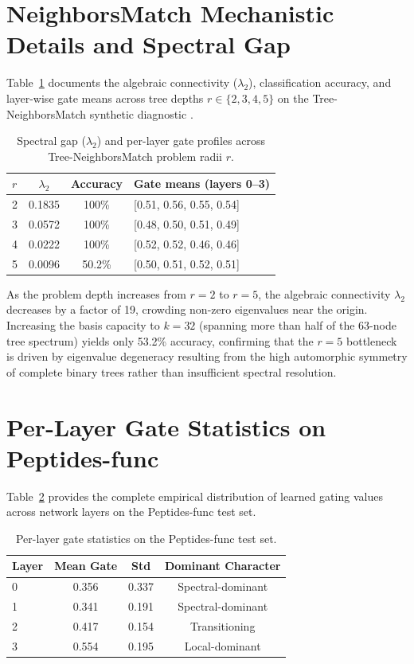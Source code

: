 \documentclass[10pt]{article}
\begin{document}
\section{NeighborsMatch Mechanistic Details and Spectral Gap}
\label{app:nm_details}

Table~\ref{tab:nm_mech} documents the algebraic connectivity ($\lambda_2$), classification accuracy, and layer-wise gate means across tree depths $r \in \{2, 3, 4, 5\}$ on the Tree-NeighborsMatch synthetic diagnostic \citep{alon2021bottleneck}.

\begin{table}[h]
\caption{Spectral gap ($\lambda_2$) and per-layer gate profiles across Tree-NeighborsMatch problem radii $r$.}
\label{tab:nm_mech}
\centering
\begin{tabular}{lccl}
\toprule
\textbf{$r$} & \textbf{$\lambda_2$} & \textbf{Accuracy} & \textbf{Gate means (layers 0--3)} \\
\midrule
2 & 0.1835 & 100\% & [0.51, 0.56, 0.55, 0.54] \\
3 & 0.0572 & 100\% & [0.48, 0.50, 0.51, 0.49] \\
4 & 0.0222 & 100\% & [0.52, 0.52, 0.46, 0.46] \\
5 & 0.0096 & 50.2\%  & [0.50, 0.51, 0.52, 0.51] \\
\bottomrule
\end{tabular}
\end{table}

As the problem depth increases from $r=2$ to $r=5$, the algebraic connectivity $\lambda_2$ decreases by a factor of 19, crowding non-zero eigenvalues near the origin. Increasing the basis capacity to $k=32$ (spanning more than half of the 63-node tree spectrum) yields only 53.2\% accuracy, confirming that the $r=5$ bottleneck is driven by eigenvalue degeneracy resulting from the high automorphic symmetry of complete binary trees rather than insufficient spectral resolution.

\section{Per-Layer Gate Statistics on Peptides-func}
\label{app:gate_stats}

Table~\ref{tab:gates} provides the complete empirical distribution of learned gating values across network layers on the Peptides-func test set.

\begin{table}[h]
\caption{Per-layer gate statistics on the Peptides-func test set.}
\label{tab:gates}
\centering
\begin{tabular}{lccc}
\toprule
\textbf{Layer} & \textbf{Mean Gate} & \textbf{Std} & \textbf{Dominant Character} \\
\midrule
0 & 0.356 & 0.337 & Spectral-dominant \\
1 & 0.341 & 0.191 & Spectral-dominant \\
2 & 0.417 & 0.154 & Transitioning     \\
3 & 0.554 & 0.195 & Local-dominant    \\
\bottomrule
\end{tabular}
\end{table}
\end{document}
